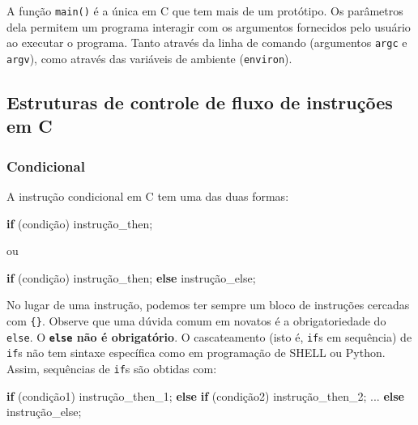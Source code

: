 \documentclass[
]{article}
\newenvironment{Shaded}{}{}
\newcommand{\ControlFlowTok}[1]{\textcolor[rgb]{0.00,0.44,0.13}{\textbf{#1}}}
\newcommand{\NormalTok}[1]{#1}
\begin{document}
A função \texttt{main()} é a única em C que tem mais de um protótipo. Os
parâmetros dela permitem um programa interagir com os argumentos
fornecidos pelo usuário ao executar o programa. Tanto através da linha
de comando (argumentos \texttt{argc} e \texttt{argv}), como através das
variáveis de ambiente (\texttt{environ}).

\hypertarget{estruturas-de-controle-de-fluxo-de-instruuxe7uxf5es-em-c}{%
\subsection{Estruturas de controle de fluxo de instruções em
C}\label{estruturas-de-controle-de-fluxo-de-instruuxe7uxf5es-em-c}}

\hypertarget{condicional}{%
\subsubsection{Condicional}\label{condicional}}

A instrução condicional em C tem uma das duas formas:

\begin{Shaded}
\begin{Highlighting}[]
\ControlFlowTok{if}\NormalTok{ (condição) instrução_then;}
\end{Highlighting}
\end{Shaded}

ou

\begin{Shaded}
\begin{Highlighting}[]
\ControlFlowTok{if}\NormalTok{ (condição) instrução_then;}
\ControlFlowTok{else}\NormalTok{ instrução_else;}
\end{Highlighting}
\end{Shaded}

No lugar de uma instrução, podemos ter sempre um bloco de instruções
cercadas com \texttt{\{\}}. Observe que uma dúvida comum em novatos é a
obrigatoriedade do \texttt{else}. O \textbf{\texttt{else} não é
obrigatório}. O cascateamento (isto é, \texttt{if}s em sequência) de
\texttt{if}s não tem sintaxe específica como em programação de SHELL ou
Python. Assim, sequências de \texttt{if}s são obtidas com:

\begin{Shaded}
\begin{Highlighting}[]
\ControlFlowTok{if}\NormalTok{ (condição1) instrução_then_1;}
\ControlFlowTok{else} \ControlFlowTok{if}\NormalTok{ (condição2) instrução_then_2;}
\NormalTok{...}
\ControlFlowTok{else}\NormalTok{ instrução_else;}
\end{Highlighting}
\end{Shaded}
\end{document}

